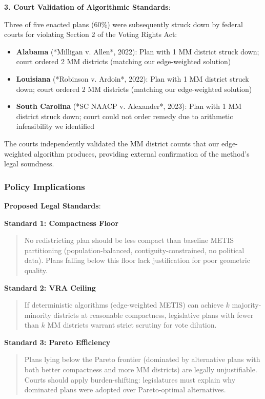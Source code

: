 \textbf{3. Court Validation of Algorithmic Standards}:

Three of five enacted plans (60\%) were subsequently struck down by federal courts for violating Section 2 of the Voting Rights Act:

\begin{itemize}
    \item \textbf{Alabama} (*Milligan v. Allen*, 2022): Plan with 1 MM district struck down; court ordered 2 MM districts (matching our edge-weighted solution)
    \item \textbf{Louisiana} (*Robinson v. Ardoin*, 2022): Plan with 1 MM district struck down; court ordered 2 MM districts (matching our edge-weighted solution)
    \item \textbf{South Carolina} (*SC NAACP v. Alexander*, 2023): Plan with 1 MM district struck down; court could not order remedy due to arithmetic infeasibility we identified
\end{itemize}

The courts independently validated the MM district counts that our edge-weighted algorithm produces, providing external confirmation of the method's legal soundness.

\subsubsection{Policy Implications}

\textbf{Proposed Legal Standards}:

\textbf{Standard 1: Compactness Floor}
\begin{quote}
No redistricting plan should be less compact than baseline METIS partitioning (population-balanced, contiguity-constrained, no political data). Plans falling below this floor lack justification for poor geometric quality.
\end{quote}

\textbf{Standard 2: VRA Ceiling}
\begin{quote}
If deterministic algorithms (edge-weighted METIS) can achieve $k$ majority-minority districts at reasonable compactness, legislative plans with fewer than $k$ MM districts warrant strict scrutiny for vote dilution.
\end{quote}

\textbf{Standard 3: Pareto Efficiency}
\begin{quote}
Plans lying below the Pareto frontier (dominated by alternative plans with both better compactness and more MM districts) are legally unjustifiable. Courts should apply burden-shifting: legislatures must explain why dominated plans were adopted over Pareto-optimal alternatives.
\end{quote}

